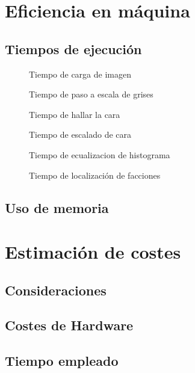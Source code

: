 \newpage

\section{Eficiencia en máquina}
\subsection{Tiempos de ejecución}
\begin{figure}[h!]
        \centering
        
        \caption{Tiempo de carga de imagen}
        \label{fig:tiempo_carga_imagen}
\end{figure}
\begin{figure}[h!]
        \centering
        
        \caption{Tiempo de paso a escala de grises}
        \label{fig:tiempo_grises}
\end{figure}
\begin{figure}[h!]
        \centering
        
        \caption{Tiempo de hallar la cara}
        \label{fig:tiempo_loc_cara}
\end{figure}

\begin{figure}[h!]
        \centering
        
        \caption{Tiempo de escalado de cara}
        \label{fig:tiempo_carga_imagen}
\end{figure}
\begin{figure}[h!]
        \centering
        
        \caption{Tiempo de ecualizacion de histograma}
        \label{fig:tiempo_carga_imagen}
\end{figure}

\begin{figure}[h!]
        \centering
        
        \caption{Tiempo de localización de facciones}
        \label{fig:tiempo_facciones}
\end{figure}


\subsection{Uso de memoria}

\newpage

\section{Estimación de costes}
\subsection{Consideraciones}
\subsection{Costes de Hardware}
\subsection{Tiempo empleado}

